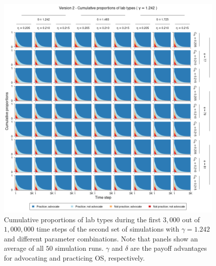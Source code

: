 \documentclass[meta, authordate,issue]{jote-new-article}
\begin{document}
\begin{figure}
  \begin{fullwidth}
    \centering
    \includegraphics[width=\textwidth]{v2_pro_plot_sens_payypro1.242.png}
    \caption{Cumulative proportions of lab types during the first $3,000$ out of $1,000,000$ time steps of the second set of simulations with $\gamma=1.242$ and different parameter combinations. Note that panels show an average of all $50$ simulation runs. $\gamma$ and $\delta$ are the payoff advantages for advocating and practicing OS, respectively.}
    \label{fig:v2_pro_plot_sens_payypro1.242}
  \end{fullwidth}
\end{figure}
%
%
\end{document}

